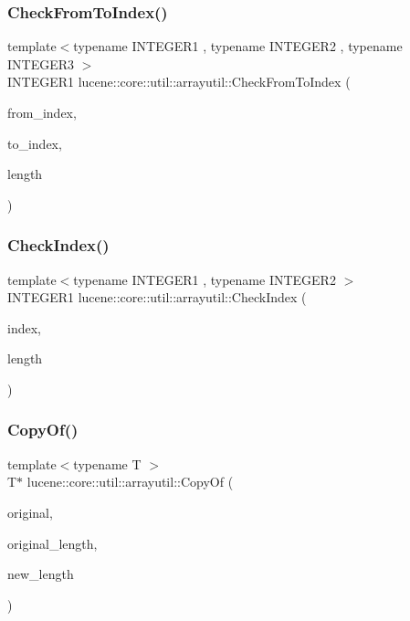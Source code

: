 \subsubsection{\texorpdfstring{Check\+From\+To\+Index()}{CheckFromToIndex()}}
{\footnotesize\ttfamily template$<$typename I\+N\+T\+E\+G\+E\+R1 , typename I\+N\+T\+E\+G\+E\+R2 , typename I\+N\+T\+E\+G\+E\+R3 $>$ \\
I\+N\+T\+E\+G\+E\+R1 lucene\+::core\+::util\+::arrayutil\+::\+Check\+From\+To\+Index (\begin{DoxyParamCaption}\item[{I\+N\+T\+E\+G\+E\+R1}]{from\+\_\+index,  }\item[{I\+N\+T\+E\+G\+E\+R2}]{to\+\_\+index,  }\item[{I\+N\+T\+E\+G\+E\+R3}]{length }\end{DoxyParamCaption})}

\mbox{\label{namespacelucene_1_1core_1_1util_1_1arrayutil_a5ae051dbfca2d74c4956413e2a60cce7}} 
\subsubsection{\texorpdfstring{Check\+Index()}{CheckIndex()}}
{\footnotesize\ttfamily template$<$typename I\+N\+T\+E\+G\+E\+R1 , typename I\+N\+T\+E\+G\+E\+R2 $>$ \\
I\+N\+T\+E\+G\+E\+R1 lucene\+::core\+::util\+::arrayutil\+::\+Check\+Index (\begin{DoxyParamCaption}\item[{I\+N\+T\+E\+G\+E\+R1}]{index,  }\item[{I\+N\+T\+E\+G\+E\+R2}]{length }\end{DoxyParamCaption})}

\mbox{\label{namespacelucene_1_1core_1_1util_1_1arrayutil_a42793db2e08af25c01c19eb099ec7d1d}} 
\subsubsection{\texorpdfstring{Copy\+Of()}{CopyOf()}\hspace{0.1cm}{\footnotesize\ttfamily [1/2]}}
{\footnotesize\ttfamily template$<$typename T $>$ \\
T$\ast$ lucene\+::core\+::util\+::arrayutil\+::\+Copy\+Of (\begin{DoxyParamCaption}\item[{const T $\ast$}]{original,  }\item[{const uint32\+\_\+t}]{original\+\_\+length,  }\item[{const uint32\+\_\+t}]{new\+\_\+length }\end{DoxyParamCaption})}

